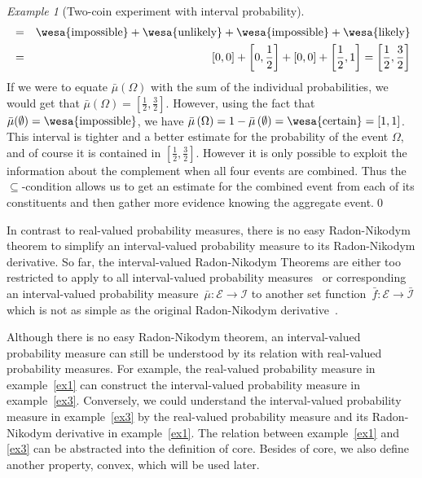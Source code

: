 \documentclass{article}
\theoremstyle{remark}
\newtheorem{example}{Example}
\newcommand{\events}{\ensuremath{\mathcal{E}}}
\newcommand{\imposs}{{\mbox{\wesa{impossible}}}}
\newcommand{\likely}{{\mbox{\wesa{likely}}}}
\newcommand{\unlikely}{{\mbox{\wesa{unlikely}}}}
\newcommand{\necess}{{\mbox{\wesa{certain}}}}
\begin{document}
\begin{example}[Two-coin experiment with interval probability]
\begin{eqnarray*}
 & = & \imposs+\unlikely+\imposs+\likely\\
 & = & \left[0,0\right]+\left[0,\frac{1}{2}\right]+\left[0,0\right]+\left[\frac{1}{2},1\right]=\left[\frac{1}{2},\frac{3}{2}\right]
\end{eqnarray*}
If we were to equate $\bar{\mu}(\Omega)$ with the sum of the individual
probabilities, we would get that $\bar{\mu}(\Omega)=\left[\frac{1}{2},\frac{3}{2}\right]$.
However, using the fact that $\bar{\mu}(\emptyset)=\imposs$, we have
$\bar{\mu}\left(\Omega\right)=1-\bar{\mu}\left(\emptyset\right)=\necess=[1,1]$.
This interval is tighter and a better estimate for the probability
of the event $\Omega$, and of course it is contained in $[\frac{1}{2},\frac{3}{2}]$.
However it is only possible to exploit the information about the complement
when all four events are combined. Thus the $\subseteq$-condition
allows us to get an estimate for the combined event from each of its
constituents and then gather more evidence knowing the aggregate event.\qed\end{example}

In contrast to real-valued probability measures, there is no easy
Radon-Nikodym theorem to simplify an interval-valued probability measure
to its Radon-Nikodym derivative. So far, the interval-valued Radon-Nikodym
Theorems are either too restricted to apply to all interval-valued
probability measures~\cite{Choquet1954,Graf1980,Goodman2013} or
corresponding an interval-valued probability measure~$\bar{\mu}:\events\rightarrow\mathscr{I}$
to another set function~$\bar{f}:\events\rightarrow\bar{\mathscr{I}}$
which is not as simple as the original Radon-Nikodym derivative~\cite{GilboaSchmeidler1994,Goodman2013}.

Although there is no easy Radon-Nikodym theorem, an interval-valued
probability measure can still be understood by its relation with real-valued
probability measures. For example, the real-valued probability measure
in example~\ref{ex1} can construct the interval-valued probability
measure in example~\ref{ex3}. Conversely, we could understand the
interval-valued probability measure in example~\ref{ex3} by the
real-valued probability measure and its Radon-Nikodym derivative in
example~\ref{ex1}. The relation between example~\ref{ex1} and
\ref{ex3} can be abstracted into the definition of core. Besides
of core, we also define another property, convex, which will be used
later.
\end{document}
